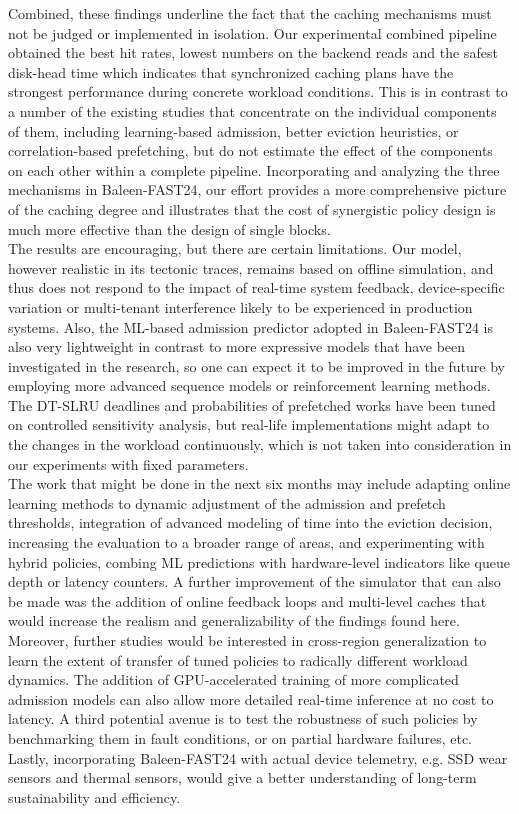 \documentclass[sigconf]{acmart}
\begin{document}
{Combined, these findings underline the fact that the caching mechanisms must not be judged or implemented in isolation. Our experimental combined pipeline obtained the best hit rates, lowest numbers on the backend reads and the safest disk-head time which indicates that synchronized caching plans have the strongest performance during concrete workload conditions. This is in contrast to a number of the existing studies that concentrate on the individual components of them, including learning-based admission, better eviction heuristics, or correlation-based prefetching, but do not estimate the effect of the components on each other within a complete pipeline. Incorporating and analyzing the three mechanisms in Baleen-FAST24, our effort provides a more comprehensive picture of the caching degree and illustrates that the cost of synergistic policy design is much more effective than the design of single blocks.\\\indent The results are encouraging, but there are certain limitations. Our model, however realistic in its tectonic traces, remains based on offline simulation, and thus does not respond to the impact of real-time system feedback, device-specific variation or multi-tenant interference likely to be experienced in production systems. Also, the ML-based admission predictor adopted in Baleen-FAST24 is also very lightweight in contrast to more expressive models that have been investigated in the research, so one can expect it to be improved in the future by employing more advanced sequence models or reinforcement learning methods. The DT-SLRU deadlines and probabilities of prefetched works have been tuned on controlled sensitivity analysis, but real-life implementations might adapt to the changes in the workload continuously, which is not taken into consideration in our experiments with fixed parameters.\\\indent The work that might be done in the next six months may include adapting online learning methods to dynamic adjustment of the admission and prefetch thresholds, integration of advanced modeling of time into the eviction decision, increasing the evaluation to a broader range of areas, and experimenting with hybrid policies, combing ML predictions with hardware-level indicators like queue depth or latency counters. A further improvement of the simulator that can also be made was the addition of online feedback loops and multi-level caches that would increase the realism and generalizability of the findings found here.\\\indent Moreover, further studies would be interested in cross-region generalization to learn the extent of transfer of tuned policies to radically different workload dynamics. The addition of GPU-accelerated training of more complicated admission models can also allow more detailed real-time inference at no cost to latency. A third potential avenue is to test the robustness of such policies by benchmarking them in fault conditions, or on partial hardware failures, etc. Lastly, incorporating Baleen-FAST24 with actual device telemetry, e.g. SSD wear sensors and thermal sensors, would give a better understanding of long-term sustainability and efficiency.


}
\end{document}
